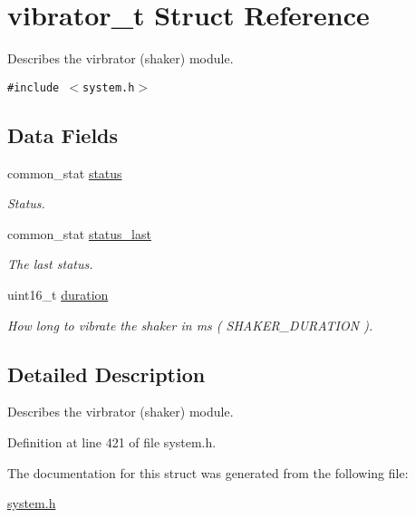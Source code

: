 \hypertarget{structvibrator__t}{
\section{vibrator\_\-t Struct Reference}
\label{structvibrator__t}
}
Describes the virbrator (shaker) module.  


{\tt \#include $<$system.h$>$}

\subsection*{Data Fields}
\begin{CompactItemize}
\item 
\hypertarget{structvibrator__t_adaff41fc66c7912a53deda23fb63836}{
common\_\-stat \hyperlink{structvibrator__t_adaff41fc66c7912a53deda23fb63836}{status}}
\label{structvibrator__t_adaff41fc66c7912a53deda23fb63836}

\begin{CompactList}\small\item\em Status. \item\end{CompactList}\item 
\hypertarget{structvibrator__t_76cb1de3fb90a68cd5e9066e8280b918}{
common\_\-stat \hyperlink{structvibrator__t_76cb1de3fb90a68cd5e9066e8280b918}{status\_\-last}}
\label{structvibrator__t_76cb1de3fb90a68cd5e9066e8280b918}

\begin{CompactList}\small\item\em The last status. \item\end{CompactList}\item 
\hypertarget{structvibrator__t_3fc18b753af884b44c24013e0ffff2b1}{
uint16\_\-t \hyperlink{structvibrator__t_3fc18b753af884b44c24013e0ffff2b1}{duration}}
\label{structvibrator__t_3fc18b753af884b44c24013e0ffff2b1}

\begin{CompactList}\small\item\em How long to vibrate the shaker in ms ( SHAKER\_\-DURATION ). \item\end{CompactList}\end{CompactItemize}


\subsection{Detailed Description}
Describes the virbrator (shaker) module. 

Definition at line 421 of file system.h.

The documentation for this struct was generated from the following file:\begin{CompactItemize}
\item 
\hyperlink{system_8h}{system.h}\end{CompactItemize}
